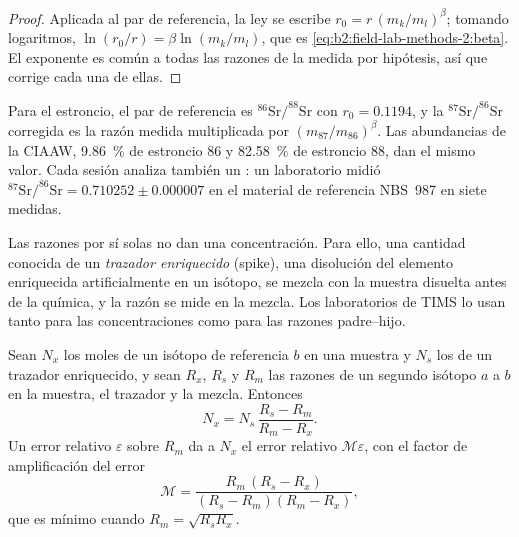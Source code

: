 \begin{proof}
Aplicada al par de referencia, la ley se escribe $r_0 = r\,(m_k/m_l)^\beta$; tomando logaritmos,
$\ln(r_0/r) = \beta\ln(m_k/m_l)$, que es \eqref{eq:b2:field-lab-methods-2:beta}. El exponente es
común a todas las razones de la medida por hipótesis, así que corrige cada una de ellas.
\end{proof}

Para el estroncio, el par de referencia es $^{86}\mathrm{Sr}/^{88}\mathrm{Sr}$ con $r_0 = 0.1194$, y
la $^{87}\mathrm{Sr}/^{86}\mathrm{Sr}$ corregida es la razón medida multiplicada por
$(m_{87}/m_{86})^\beta$. Las abundancias de la CIAAW, \qty{9.86}{\percent} de estroncio 86 y
\qty{82.58}{\percent} de estroncio 88, dan el mismo valor. Cada sesión analiza también un : un laboratorio midió $^{87}\mathrm{Sr}/^{86}\mathrm{Sr} = 0.710252 \pm
0.000007$ en el material de referencia NBS~987 en siete medidas.

Las razones por sí solas no dan una concentración. Para ello, una cantidad conocida de un \emph{trazador enriquecido} (spike), una disolución del
elemento enriquecida artificialmente en un isótopo, se mezcla con la muestra disuelta antes de la
química, y la razón se mide en la mezcla. Los laboratorios de TIMS lo usan tanto para
las concentraciones como para las razones padre--hijo.

\begin{proposition}\label{prop:b2:field-lab-methods-2:id}
Sean $N_x$ los moles de un isótopo de referencia $b$ en una muestra y $N_s$ los de un trazador enriquecido, y sean
$R_x$, $R_s$ y $R_m$ las razones de un segundo isótopo $a$ a $b$ en la muestra, el trazador y
la mezcla. Entonces
\begin{equation}
N_x = N_s\,\frac{R_s - R_m}{R_m - R_x} .
\label{eq:b2:field-lab-methods-2:id}
\end{equation}
Un error relativo $\varepsilon$ sobre $R_m$ da a $N_x$ el error relativo $\mathcal{M}\varepsilon$,
con el factor de amplificación del error
\begin{equation}
\mathcal{M} = \frac{R_m\,(R_s - R_x)}{(R_s - R_m)(R_m - R_x)} ,
\label{eq:b2:field-lab-methods-2:mag}
\end{equation}
que es mínimo cuando $R_m = \sqrt{R_s R_x}$.
\end{proposition}

